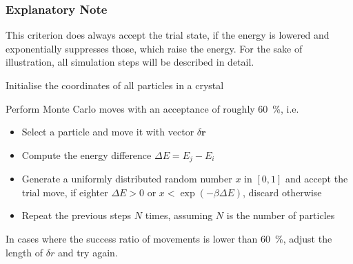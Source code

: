 \subsubsection*{Explanatory Note}
This criterion does always accept the trial state, if the energy is lowered and exponentially suppresses those, which raise the energy.
For the sake of illustration, all simulation steps will be described in detail.
\begin{enumerate}
	\item{Initialise the coordinates of all particles in a crystal}
	\item{Perform Monte Carlo moves with an acceptance of roughly \SI{60}{\percent}, i.e.
		\begin{itemize}
			\item{Select a particle and move it with vector $\delta \bm r$}
			\item{Compute the energy difference $\Delta E = E_j - E_i$}
			\item{Generate a uniformly distributed random number $x$ in $[0, 1]$ and accept the trial move, if eighter $\Delta E>0$ or $x < \exp(-\beta\Delta E)$, discard otherwise}
			\item{Repeat the previous steps $N$ times, assuming $N$ is the number of particles}
		\end{itemize}
	\item{In cases where the success ratio of movements is lower than \SI{60}{\percent}, adjust the length of $\delta r$ and try again.}
}
\end{enumerate}
